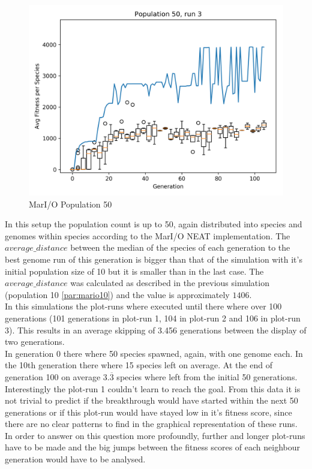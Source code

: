 \begin{figure}[h]
\begin{minipage}{0.33\textwidth}
				\end{minipage}
				\begin{minipage}{0.33\textwidth}
					\centering
					\includegraphics[width=1\textwidth]{graphics/mario/pop50_run3} %
				\end{minipage}
				\caption{MarI/O Population 50}
				\label{fig:mario50}
			\end{figure}
			In this setup the population count is up to 50, again distributed into species and genomes within species according to the MarI/O NEAT implementation. The $average\_distance$  between the median of the species of each generation to the best genome run of this generation is bigger than that of the simulation with it's initial population size of 10 but it is smaller than in the last case. The $average\_distance$ was calculated as described in the previous simulation (population 10 \ref{par:mario10}) and the value is approximately $1406$.\\
			In this simulations the plot-runs where executed until there where over 100 generations (101 generations in plot-run 1, 104 in plot-run 2 and 106 in plot-run 3). This results in an average skipping of 3.456 generations between the display of two generations.\\
			In generation 0 there where 50 species spawned, again, with one genome each. In the 10th generation there where 15 species left on average. At the end of generation 100 on average $3.\overline{3}$ species where left from the initial 50 generations.\\
			Interestingly the plot-run 1 couldn't learn to reach the goal. From this data it is not trivial to predict if the breakthrough would have started within the next 50 generations or if this plot-run would have stayed low in it's fitness score, since there are no clear patterns to find in the graphical representation of these runs. In order to answer on this question more profoundly, further and longer plot-runs have to be made and the big jumps between the fitness scores of each neighbour generation would have to be analysed.\\
